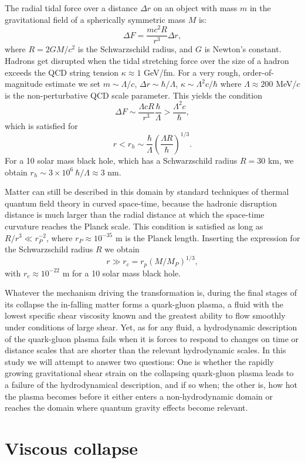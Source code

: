 \documentclass[article,twocolumn]{revtex4}
\newcommand{\be}{\begin{equation}}
\newcommand{\ee}{\end{equation}}
\begin{document}
The radial tidal force over a distance $\Delta r$ on an object with mass $m$ in the gravitational field of a spherically symmetric mass $M$ is:
\be
\Delta F = \frac{mc^2 R}{r^3} \Delta r ,
\ee
where $R = 2GM/c^2$ is the Schwarzschild radius, and $G$ is Newton's constant. Hadrons get disrupted when the tidal stretching force over the size of a hadron exceeds the QCD string tension $\kappa \approx 1$ GeV/fm. For a very rough, order-of-magnitude estimate we set $m \sim \Lambda/c$, $\Delta r \sim \hbar/\Lambda$, $\kappa \sim \Lambda^2c/\hbar$ where $\Lambda \approx 200$ MeV/$c$ is the non-perturbative QCD scale parameter. This yields the condition
\be
\Delta F \sim \frac{\Lambda c R}{r^3} \frac{\hbar}{\Lambda} > \frac{\Lambda^2 c}{\hbar} ,
\ee
which is satisfied for
\be
r < r_h \sim \frac{\hbar}{\Lambda} \left( \frac{\Lambda R}{\hbar} \right)^{1/3} .
\ee
For a 10 solar mass black hole, which has a Schwarzschild radius $R = 30$ km, we obtain $r_h \sim 3\times 10^6~\hbar/\Lambda \approx 3$ nm. 

Matter can still be described in this domain by standard techniques of thermal quantum field theory in curved space-time, because the hadronic disruption distance is much larger than the radial distance at which the space-time curvature reaches the Planck scale. This condition is satisfied as long as
$R/r^3 \ll r_P^{-2}$,
where $r_P \approx 10^{-35}$ m is the Planck length. Inserting the expression for the Schwarzschild radius $R$ we obtain
\be
r \gg r_c = r_p (M/M_P)^{1/3} ,
\label{eq:r-c}
\ee 
with $r_c \approx 10^{-22}$ m for a 10 solar mass black hole.

Whatever the mechanism driving the transformation is, during the final stages of its collapse the in-falling matter forms a quark-gluon plasma, a fluid with the lowest specific shear viscosity known and the greatest ability to flow smoothly under conditions of large shear. Yet, as for any fluid, a hydrodynamic description of the quark-gluon plasma fails when it is forces to respond to changes on time or distance scales that are shorter than the relevant hydrodynamic scales. In this study we will attempt to answer two questions: One is whether the rapidly growing gravitational shear strain on the collapsing quark-gluon plasma leads to a failure of the hydrodynamical description, and if so when; the other is, how hot the plasma becomes before it either enters a non-hydrodynamic domain or reaches the domain where quantum gravity effects become relevant.

\section{Viscous collapse}
\end{document}
